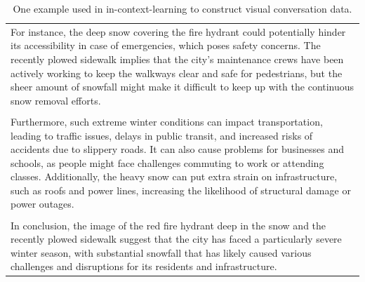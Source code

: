 \begin{table}[h!]
\begin{minipage}{0.99\columnwidth}
\begin{tcolorbox}
\begin{tabular}{p{}}
\\
For instance, the deep snow covering the fire hydrant could potentially hinder its accessibility in case of emergencies, which poses safety concerns. The recently plowed sidewalk implies that the city's maintenance crews have been actively working to keep the walkways clear and safe for pedestrians, but the sheer amount of snowfall might make it difficult to keep up with the continuous snow removal efforts.  \\
\\
Furthermore, such extreme winter conditions can impact transportation, leading to traffic issues, delays in public transit, and increased risks of accidents due to slippery roads. It can also cause problems for businesses and schools, as people might face challenges commuting to work or attending classes. Additionally, the heavy snow can put extra strain on infrastructure, such as roofs and power lines, increasing the likelihood of structural damage or power outages.  \\
\\
In conclusion, the image of the red fire hydrant deep in the snow and the recently plowed sidewalk suggest that the city has faced a particularly severe winter season, with substantial snowfall that has likely caused various challenges and disruptions for its residents and infrastructure.
    \end{tabular}
\end{tcolorbox}
\vspace{-2mm}
\caption{One example used in in-context-learning to construct visual conversation data.}
    \label{tab:example1_cap_conv}
\end{minipage}
\end{table}





